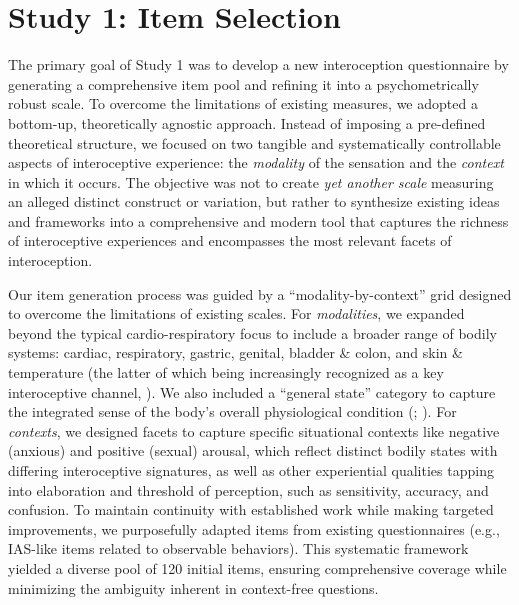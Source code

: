 \documentclass[
  jou,
  floatsintext,
  longtable,
  nolmodern,
  notxfonts,
  notimes,
  colorlinks=true,linkcolor=blue,citecolor=blue,urlcolor=blue]{apa7}
\begin{document}
\section{Study 1: Item Selection}\label{study-1-item-selection}

The primary goal of Study 1 was to develop a new interoception
questionnaire by generating a comprehensive item pool and refining it
into a psychometrically robust scale. To overcome the limitations of
existing measures, we adopted a bottom-up, theoretically agnostic
approach. Instead of imposing a pre-defined theoretical structure, we
focused on two tangible and systematically controllable aspects of
interoceptive experience: the \emph{modality} of the sensation and the
\emph{context} in which it occurs. The objective was not to create
\emph{yet another scale} measuring an alleged distinct construct or
variation, but rather to synthesize existing ideas and frameworks into a
comprehensive and modern tool that captures the richness of
interoceptive experiences and encompasses the most relevant facets of
interoception.

Our item generation process was guided by a ``modality-by-context'' grid
designed to overcome the limitations of existing scales. For
\emph{modalities}, we expanded beyond the typical cardio-respiratory
focus to include a broader range of bodily systems: cardiac,
respiratory, gastric, genital, bladder \& colon, and skin \& temperature
(the latter of which being increasingly recognized as a key
interoceptive channel, ). We also included a ``general state'' category to
capture the integrated sense of the body's overall physiological
condition (;
). For
\emph{contexts}, we designed facets to capture specific situational
contexts like negative (anxious) and positive (sexual) arousal, which
reflect distinct bodily states with differing interoceptive signatures,
as well as other experiential qualities tapping into elaboration and
threshold of perception, such as sensitivity, accuracy, and confusion.
To maintain continuity with established work while making targeted
improvements, we purposefully adapted items from existing questionnaires
(e.g., IAS-like items related to observable behaviors). This systematic
framework yielded a diverse pool of 120 initial items, ensuring
comprehensive coverage while minimizing the ambiguity inherent in
context-free questions.
\end{document}
